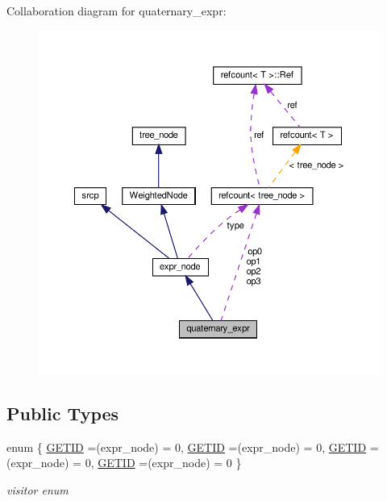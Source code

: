 Collaboration diagram for quaternary\+\_\+expr\+:
\nopagebreak
\begin{figure}[H]
\begin{center}
\leavevmode
\includegraphics[width=350pt]{df/dbd/structquaternary__expr__coll__graph}
\end{center}
\end{figure}
\subsection*{Public Types}
\begin{DoxyCompactItemize}
\item 
enum \{ \hyperlink{structquaternary__expr_aae3f44a5bae1c4f51e24df32c3ddb955af36f97b82277a4ef4520cc37398f4e9b}{G\+E\+T\+ID} =(expr\+\_\+node) = 0, 
\hyperlink{structquaternary__expr_aae3f44a5bae1c4f51e24df32c3ddb955af36f97b82277a4ef4520cc37398f4e9b}{G\+E\+T\+ID} =(expr\+\_\+node) = 0, 
\hyperlink{structquaternary__expr_aae3f44a5bae1c4f51e24df32c3ddb955af36f97b82277a4ef4520cc37398f4e9b}{G\+E\+T\+ID} =(expr\+\_\+node) = 0, 
\hyperlink{structquaternary__expr_aae3f44a5bae1c4f51e24df32c3ddb955af36f97b82277a4ef4520cc37398f4e9b}{G\+E\+T\+ID} =(expr\+\_\+node) = 0
 \}\begin{DoxyCompactList}\small\item\em visitor enum \end{DoxyCompactList}
\end{DoxyCompactItemize}
